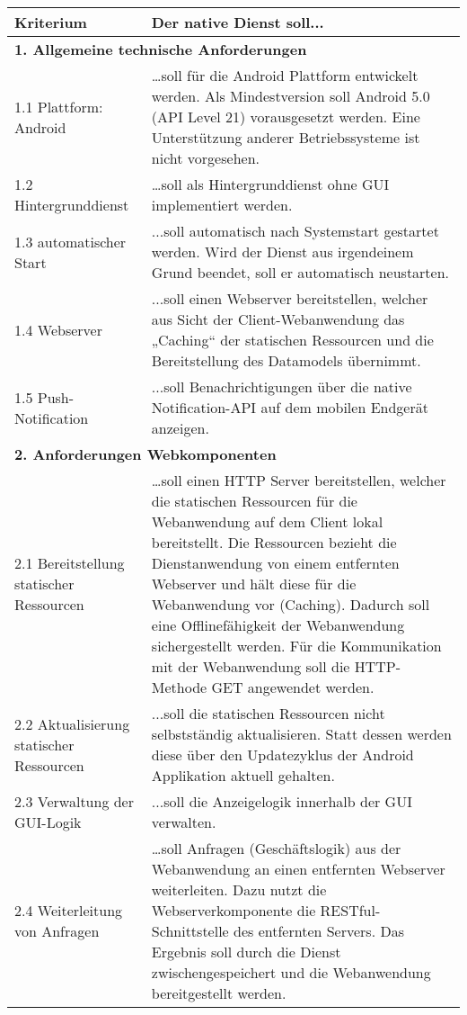 \begin{longtable}{@{}XX@{}}  
\textbf{Kriterium} & \textbf{Der native Dienst soll...} \\[6pt]
\midrule
\endhead
\multicolumn{2}{p{\dimexpr\textwidth-2\tabcolsep\relax}}{\textbf{1. Allgemeine technische Anforderungen}} \\
\midrule
1.1 Plattform: Android & …soll für die Android Plattform entwickelt werden. Als Mindestversion soll Android 5.0 (API Level 21) vorausgesetzt werden. Eine Unterstützung anderer Betriebssysteme ist nicht vorgesehen. \\ [6pt]
1.2 Hintergrunddienst & …soll als Hintergrunddienst ohne GUI implementiert werden. \\[6pt]
1.3 automatischer Start & ...soll automatisch nach Systemstart gestartet werden. Wird der Dienst aus irgendeinem Grund beendet, soll er automatisch neustarten. \\[6pt]
1.4 Webserver & ...soll einen Webserver bereitstellen, welcher aus Sicht der Client-Webanwendung das „Caching“ der statischen Ressourcen und die Bereitstellung des Datamodels übernimmt. \\[6pt]
1.5 Push-Notification & ...soll Benachrichtigungen über die native Notification-API auf dem mobilen Endgerät anzeigen. \\[10pt]
\midrule
\multicolumn{2}{p{\dimexpr\textwidth-2\tabcolsep\relax}}{\textbf{2. Anforderungen Webkomponenten}} \\
\midrule
2.1 Bereitstellung statischer Ressourcen & …soll einen HTTP Server bereitstellen, welcher die statischen Ressourcen für die Webanwendung auf dem Client lokal bereitstellt. Die Ressourcen bezieht die Dienstanwendung von einem entfernten Webserver und hält diese für die Webanwendung vor (Caching). Dadurch soll eine Offlinefähigkeit der Webanwendung sichergestellt werden. Für die Kommunikation mit der Webanwendung soll die HTTP-Methode GET angewendet werden. \\[6pt]
2.2 Aktualisierung statischer Ressourcen & ...soll die statischen Ressourcen nicht selbstständig aktualisieren. Statt dessen werden diese über den Updatezyklus der Android Applikation aktuell gehalten. \\[6pt]
2.3 Verwaltung der GUI-Logik & ...soll die Anzeigelogik innerhalb der GUI verwalten.  \\[6pt]
2.4 Weiterleitung von Anfragen & …soll Anfragen (Geschäftslogik) aus der Webanwendung an einen entfernten Webserver weiterleiten. Dazu nutzt die Webserverkomponente die RESTful-Schnittstelle des entfernten Servers. Das Ergebnis soll durch die Dienst zwischengespeichert und die Webanwendung bereitgestellt werden. \\[6pt]

\end{longtable}

